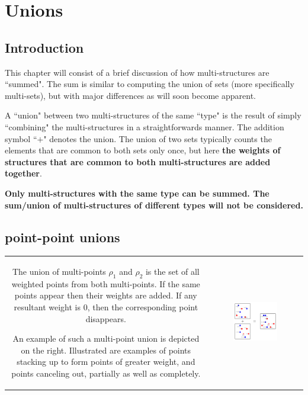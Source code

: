 

\chapter{Unions}\label{chap:unions}

\section{Introduction}

This chapter will consist of a brief discussion of how multi-structures are ``summed". The sum is similar to computing the union of sets (more specifically multi-sets), but with major differences as will soon become apparent.

A ``union" between two multi-structures of the same ``type" is the result of simply ``combining" the multi-structures in a straightforwards manner. The addition symbol ``\(+\)" denotes the union. The union of two sets typically counts the elements that are common to both sets only once, but here {\bf the weights of structures that are common to both multi-structures are added together}. 

{\bf Only multi-structures with the same type can be summed. The sum/union of multi-structures of different types will not be considered.} 


\section{point-point unions}

\vspace{5mm}

\begin{tabular}{cc}
\parbox{0.5\textwidth}{
The union of multi-points \(\rho_1\) and \(\rho_2\) is the set of all weighted points from both multi-points. If the same points appear then their weights are added. If any resultant weight is \(0\), then the corresponding point disappears.  

An example of such a multi-point union is depicted on the right. Illustrated are examples of points stacking up to form points of greater weight, and points canceling out, partially as well as completely. 
} & \parbox{0.5\textwidth}{
\includegraphics[width = 0.5\textwidth]{Unions/multipoint_unions}
}
\end{tabular}

